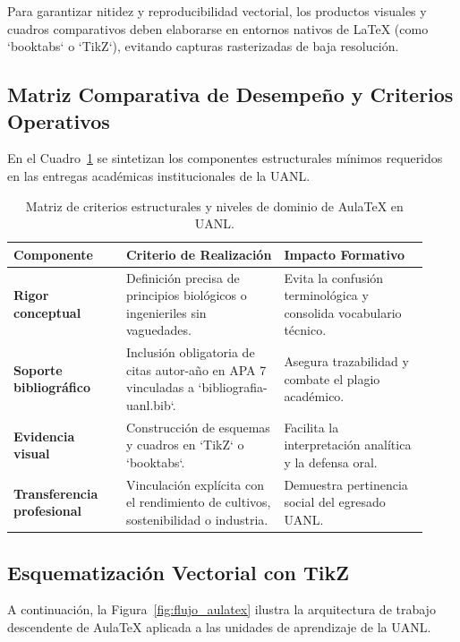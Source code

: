 \documentclass[
	spanish,
	letterpaper, oneside
]{article}
\begin{document}
Para garantizar nitidez y reproducibilidad vectorial, los productos visuales y cuadros comparativos deben elaborarse en entornos nativos de LaTeX (como `booktabs` o `TikZ`), evitando capturas rasterizadas de baja resolución.

\subsection{Matriz Comparativa de Desempeño y Criterios Operativos}
En el Cuadro~\ref{tab:criterios_uanl} se sintetizan los componentes estructurales mínimos requeridos en las entregas académicas institucionales de la UANL.

\begin{table}[htbp]
	\centering
	\small
	\caption{Matriz de criterios estructurales y niveles de dominio de AulaTeX en UANL.}
	\label{tab:criterios_uanl}
	\begin{tabular}{p{0.25\linewidth} p{0.35\linewidth} p{0.32\linewidth}}
		\toprule
		\textbf{Componente} & \textbf{Criterio de Realización} & \textbf{Impacto Formativo} \\
		\midrule
		\textbf{Rigor conceptual} & Definición precisa de principios biológicos o ingenieriles sin vaguedades. & Evita la confusión terminológica y consolida vocabulario técnico. \\
		\addlinespace
		\textbf{Soporte bibliográfico} & Inclusión obligatoria de citas autor-año en APA 7 vinculadas a `bibliografia-uanl.bib`. & Asegura trazabilidad y combate el plagio académico. \\
		\addlinespace
		\textbf{Evidencia visual} & Construcción de esquemas y cuadros en `TikZ` o `booktabs`. & Facilita la interpretación analítica y la defensa oral. \\
		\addlinespace
		\textbf{Transferencia profesional} & Vinculación explícita con el rendimiento de cultivos, sostenibilidad o industria. & Demuestra pertinencia social del egresado UANL. \\
		\bottomrule
	\end{tabular}
\end{table}

\subsection{Esquematización Vectorial con TikZ}
A continuación, la Figura~\ref{fig:flujo_aulatex} ilustra la arquitectura de trabajo descendente de AulaTeX aplicada a las unidades de aprendizaje de la UANL.
\end{document}
